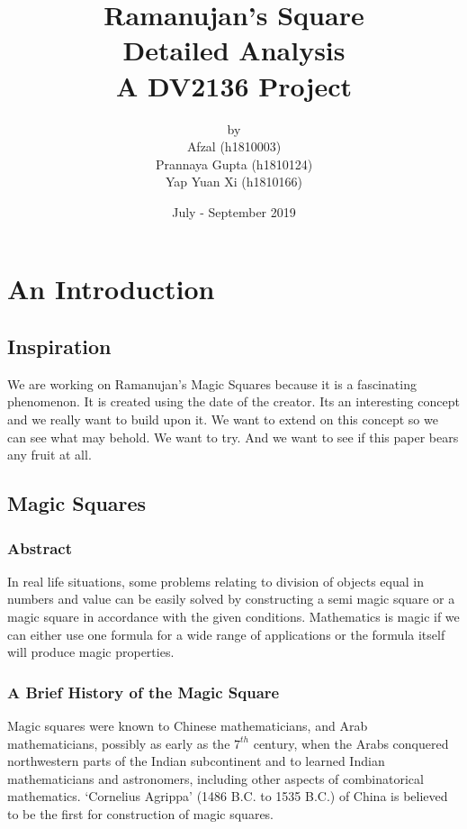 \documentclass{article}
\title{%
  \Huge Ramanujan's Square \\
  \LARGE Detailed Analysis\\
  \Large A DV2136 Project}
\author{by \\
\Large Afzal (h1810003) \\
\Large Prannaya Gupta (h1810124) \\
\Large Yap Yuan Xi (h1810166) \\
}
\date{\Large July - September 2019}
\begin{document}
\maketitle

\tableofcontents
\newpage
\section{An Introduction}

\subsection{Inspiration}
We are working on Ramanujan's Magic Squares because it is a fascinating phenomenon. It is created using the date of the creator. Its an interesting concept and we really want to build upon it. We want to extend on this concept so we can see what may behold. We want to try. And we want to see if this paper bears any fruit at all.

\newpage
\subsection{Magic Squares}

\subsubsection{Abstract}
In real life situations, some problems relating to division of objects equal in numbers and value can be easily solved by constructing a semi magic square or a magic square in accordance with the given conditions. Mathematics is magic if we can either use one formula for a wide range of applications or the formula itself will produce magic properties.

\subsubsection{A Brief History of the Magic Square}
Magic squares were known to Chinese mathematicians, and Arab mathematicians, possibly as early as the $7^{th}$ century, when the Arabs conquered northwestern parts of the Indian subcontinent and to learned Indian mathematicians and astronomers, including other aspects of combinatorical mathematics. ‘Cornelius Agrippa’ (1486 B.C. to 1535 B.C.) of China is believed to be the first for construction of magic squares.
\end{document}
